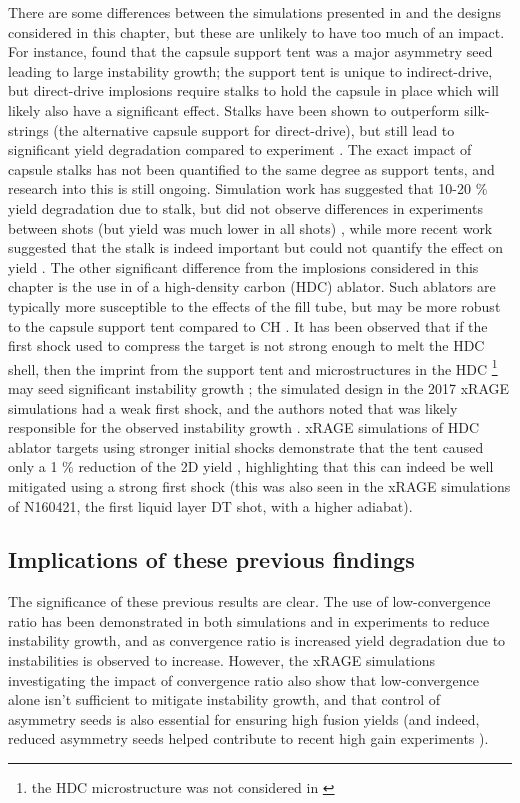 There are some differences between the simulations presented in \cite{Haines2017a} and the designs considered in this chapter, but these are unlikely to have too much of an impact. For instance, \cite{Haines2017a} found that the capsule support tent was a major asymmetry seed leading to large instability growth; the support tent is unique to indirect-drive, but direct-drive implosions require stalks to hold the capsule in place which will likely also have a significant effect. Stalks have been shown to outperform silk-strings (the alternative capsule support for direct-drive), but still lead to significant yield degradation compared to experiment \cite{Igumenshchev2009}. The exact impact of capsule stalks has not been quantified to the same degree as support tents, and research into this is still ongoing. Simulation work has suggested that 10-20 \% yield degradation due to stalk, but did not observe differences in experiments between shots (but yield was much lower in all shots) \cite{Shah2017}, while more recent work suggested that the stalk is indeed important but could not quantify the effect on yield \cite{GatuJohnson2020}. The other significant difference from the implosions considered in this chapter is the use in \cite{Haines2017a} of a high-density carbon (HDC) ablator. Such ablators are typically more susceptible to the effects of the fill tube, but may be more robust to the capsule support tent compared to CH \cite{Zylstra2022, Abu-Shawareb2022, Haines2019a, Clark2018}. It has been observed that if the first shock used to compress the target is not strong enough to melt the HDC shell, then the imprint from the support tent and microstructures in the HDC \footnote{the HDC microstructure was not considered in \cite{Haines2017a}} may seed significant instability growth \cite{Mackinnon2014, Haines2019a}; the simulated design in the 2017 xRAGE simulations had a weak first shock, and the authors noted that was likely responsible for the observed instability growth \cite{Haines2017a}. xRAGE simulations of HDC ablator targets using stronger initial shocks demonstrate that the tent caused only a 1 \% reduction of the 2D yield \cite{Haines2019a}, highlighting that this can indeed be well mitigated using a strong first shock (this was also seen in the xRAGE simulations of N160421, the first liquid layer DT shot, with a higher adiabat).

\subsection{Implications of these previous findings} 
The significance of these previous results are clear. The use of low-convergence ratio has been demonstrated in both simulations and in experiments to reduce instability growth, and as convergence ratio is increased yield degradation due to instabilities is observed to increase. However, the xRAGE simulations investigating the impact of convergence ratio \cite{Haines2017a} also show that low-convergence alone isn't sufficient to mitigate instability growth, and that control of asymmetry seeds is also essential for ensuring high fusion yields (and indeed, reduced asymmetry seeds helped contribute to recent high gain experiments \cite{Zylstra2022}).

